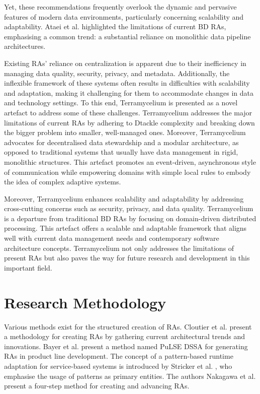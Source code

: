 \documentclass{ieeeaccess}
\begin{document}
Yet, these recommendations frequently overlook the dynamic and pervasive features of modern data environments, particularly concerning scalability and adaptability. Ataei et al. \cite{ataei2022state} highlighted the limitations of current BD RAs, emphasising a common trend: a substantial reliance on monolithic data pipeline architectures. 

Existing RAs' reliance on centralization is apparent due to their inefficiency in managing data quality, security, privacy, and metadata. Additionally, the inflexible framework of these systems often results in difficulties with scalability and adaptation, making it challenging for them to accommodate changes in data and technology settings. To this end, Terramycelium is presented as a novel artefact to address some of these challenges. Terramycelium addresses the major limitations of current RAs by adhering to Dtackle complexity and breaking down the bigger problem into smaller, well-managed ones. Moreover, Terramycelium advocates for decentralised data stewardship and a modular architecture, as opposed to traditional systems that usually have data management in rigid, monolithic structures. This artefact promotes an event-driven, asynchronous style of communication while empowering domains with simple local rules to embody the idea of complex adaptive systems. 

Moreover, Terramycelium enhances scalability and adaptability by addressing cross-cutting concerns such as security, privacy, and data quality. Terramycelium is a departure from traditional BD RAs by focusing on domain-driven distributed processing. This artefact offers a scalable and adaptable framework that aligns well with current data management needs and contemporary software architecture concepts. Terramycelium not only addresses the limitations of present RAs but also paves the way for future research and development in this important field.

\section{Research Methodology}

Various methods exist for the structured creation of RAs. Cloutier et al. \cite{Cloutier2010} present a methodology for creating RAs by gathering current architectural trends and innovations. Bayer et al. \cite{bayer1999pulse} present a method named PuLSE DSSA for generating RAs in product line development. The concept of a pattern-based runtime adaptation for service-based systems is introduced by Stricker et al. \cite{stricker2010creating}, who emphasise the usage of patterns as primary entities. The authors Nakagawa et al. \cite{nakagawa2009towards} present a four-step method for creating and advancing RAs. 
\end{document}
